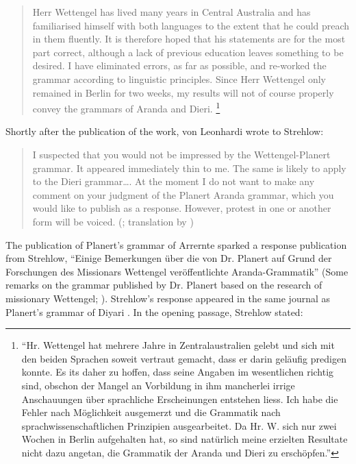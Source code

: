 \begin{quote}
Herr Wettengel has lived many years in Central Australia and has familiarised himself with both languages to the extent that he could preach in them fluently. It is therefore hoped that his statements are for the most part correct, although a lack of previous education leaves something to be desired. I have eliminated errors, as far as possible, and re-worked the grammar according to linguistic principles. Since Herr Wettengel only remained in Berlin for two weeks, my results will not of course properly convey the grammars of Aranda and Dieri. \citep[551]{planert_australische_1907}\footnote{``Hr. Wettengel hat mehrere Jahre in Zentralaustralien gelebt und sich mit den beiden Sprachen soweit vertraut gemacht, dass er darin geläufig predigen konnte. Es its daher zu hoffen, dass seine Angaben im wesentlichen richtig sind, obschon der Mangel an Vorbildung in ihm mancherlei irrige Anschauungen über sprachliche Erscheinungen entstehen liess. Ich habe die Fehler nach Möglichkeit ausgemerzt und die Grammatik nach sprachwissenschaftlichen Prinzipien ausgearbeitet. Da Hr. W. sich nur zwei Wochen in Berlin aufgehalten hat, so sind natürlich meine erzielten Resultate nicht dazu angetan, die Grammatik der Aranda und Dieri zu erschöpfen.''}
\end{quote}

Shortly after the publication of the work, von Leonhardi wrote to Strehlow:

\begin{quote}
I suspected that you would not be impressed by the Wettengel-Planert grammar. It appeared immediately thin to me. The same is likely to apply to the Dieri grammar…. At the moment I do not want to make any comment on your judgment of the Planert Aranda grammar, which you would like to publish as a response. However, protest in one or another form will be voiced. (\citealt{leonhardi_letter_1908}; translation by \citealt[348]{kenny_missionary_2008})
\end{quote}


The publication of Planert’s grammar of Arrernte sparked a response publication from Strehlow, “Einige Bemerkungen über die von Dr. Planert auf Grund der Forschungen des Missionars Wettengel veröffentlichte Aranda-Grammatik” (Some remarks on the grammar published by Dr. Planert based on the research of missionary Wettengel; \citeyear{strehlow_einige_1908}). Strehlow’s response appeared in the same journal as Planert’s grammar of Diyari \citeyearpar{planert_australische_1908}. In the opening passage, Strehlow stated:

